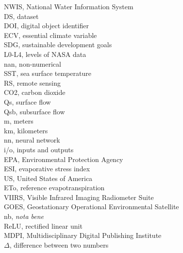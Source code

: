 NWIS, National Water Information System \\ 
DS, dataset\\ 
DOI, digital object identifier\\ 
ECV, essential climate variable\\ 
SDG, sustainable development goals \\
L0-L4, levels of NASA data\\ 
nan, non-numerical\\ 
SST, sea surface temperature\\ 
RS, remote sensing\\ 
CO2, carbon dioxide \\
Qs, surface flow \\
Qsb, subsurface flow\\
m, meters\\ 
km, kilometers\\ 
nn, neural network\\ 
i/o, inputs and outputs\\ 
EPA, Environmental Protection Agency\\ 
ESI, evaporative stress index\\ 
US, United States of America\\ 
ETo, reference evapotranspiration\\ 
VIIRS, Visible Infrared Imaging Radiometer Suite\\ 
GOES, Geostationary Operational Environmental Satellite\\
nb,  \emph{nota bene}\\ 
ReLU, rectified linear unit\\
MDPI, Multidisciplinary Digital Publishing Institute\\
$\Delta$, difference between two numbers